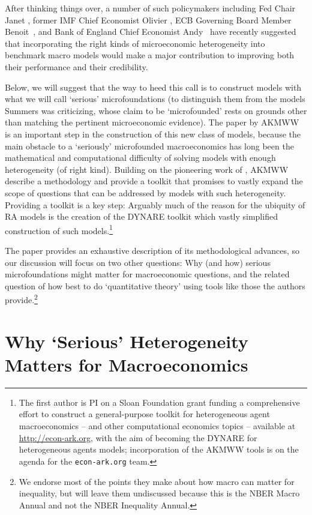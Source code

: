 \documentclass[titlepage]{econtex}
\begin{document}
After thinking things over, a number of such policymakers including Fed Chair Janet \cite{yellenHetero}, former IMF Chief Economist Olivier \cite{blanchardDSGE}, ECB Governing Board Member Benoit~\cite{coeureHetero}, and Bank of England Chief Economist Andy~\cite{haldaneDappled} have recently suggested that incorporating the right kinds of microeconomic heterogeneity into benchmark macro models would make a major contribution to improving both their performance and their credibility.  

Below, we will suggest that the way to heed this call is to construct models with what we will call `serious' microfoundations (to distinguish them from the models Summers was criticizing, whose claim to be `microfounded' rests on grounds other than matching the pertinent microeconomic evidence).  The paper by AKMWW is an important step in the construction of this new class of models, because the main obstacle to a `seriously' microfounded macroeconomics has long been the mathematical and computational difficulty of solving models with enough heterogeneity (of right kind).  Building on the pioneering work of \cite{reiterSolving,reiterApproximate}, AKMWW describe a methodology and provide a toolkit that promises to vastly expand the scope of questions that can be addressed by models with such heterogeneity.  Providing a toolkit is a key step: Arguably much of the reason for the ubiquity of RA models is the creation of the DYNARE toolkit which vastly simplified construction of such models.\footnote{The first author is PI on a Sloan Foundation grant funding a comprehensive effort to construct a general-purpose toolkit for heterogeneous agent macroeconomics -- and other computational economics topics -- available at \href{econ-ark.org}{http://econ-ark.org}, with the aim of becoming the DYNARE for heterogeneous agents models; incorporation of the AKMWW tools is on the agenda for the \texttt{econ-ark.org} team.}

The paper provides an exhaustive description of its methodological advances, so our discussion will focus on two other questions: Why (and how) serious microfoundations might matter for macroeconomic questions, and the related question of how best to do `quantitative theory' using tools like those the authors provide.\footnote{We endorse  most of the points they make about how macro can matter for inequality, but will leave them undiscussed because this is the NBER Macro Annual and not the NBER Inequality Annual.}
\hypertarget{SeriousHeterogeneity}{}
\section{Why `Serious' Heterogeneity Matters for Macroeconomics}
\end{document}
